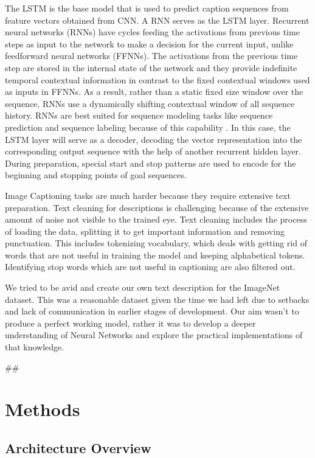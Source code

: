 \documentclass[conference]{IEEEtran}
\begin{document}
The LSTM is the base model that is used to predict caption sequences from feature vectors obtained from CNN. A RNN serves as the LSTM layer. Recurrent neural networks (RNNs) have cycles feeding the activations from previous time steps as input to the network to make a decision for the current input, unlike feedforward neural networks (FFNNs). The activations from the previous time step are stored in the internal state of the network and they provide indefinite temporal contextual information in contrast to the fixed contextual windows used as inputs in FFNNs. As a result, rather than a static fixed size window over the sequence, RNNs use a dynamically shifting contextual window of all sequence history. RNNs are best suited for sequence modeling tasks like sequence prediction and sequence labeling because of this capability \cite{b11}. In this case, the LSTM layer will serve as a decoder, decoding the vector representation into the corresponding output sequence with the help of another recurrent hidden layer. During preparation, special start and stop patterns are used to encode for the beginning and stopping points of goal sequences.

Image Captioning tasks are much harder because they require extensive text preparation. Text cleaning for descriptions is challenging because of the extensive amount of noise not visible to the trained eye. Text cleaning includes the process of loading the data, splitting it to get important information and removing punctuation. This includes tokenizing vocabulary, which deals with getting rid of words that are not useful in training the model and keeping alphabetical tokens. Identifying stop words which are not useful in captioning are also filtered out. 

We tried to be avid and create our own text description for the ImageNet dataset. This was a reasonable dataset given the time we had left due to setbacks and lack of communication in earlier stages of development. Our aim wasn’t to produce a perfect working model, rather it was to develop a deeper understanding of Neural Networks and explore the practical implementations of that knowledge. 


## %
\section{Methods}

\subsection{Architecture Overview}
\end{document}
